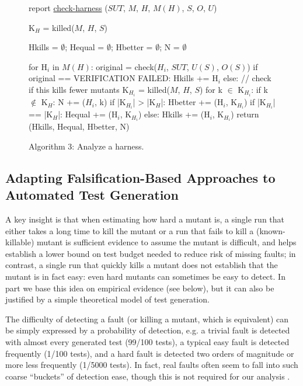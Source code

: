 \documentclass{svjour3}
\begin{document}
\begin{figure}
{\scriptsize 
\begin{code}
report {\underline{check-harness}} ($SUT$, $M$, $H$, $M(H)$, $S$, $O$, $U$) 
\vspace{0.1in}

  K$_H$ = killed($M$, $H$, $S$) 

  Hkills = $\emptyset$; Hequal = $\emptyset$; Hbetter = $\emptyset$; N = $\emptyset$

  for H$_i$ in $M(H)$:
     original = check($H_i$, $SUT$, $U(S)$, $O(S)$)
     if original == VERIFICATION FAILED: 
        Hkills += H$_i$
     else: // check if this kills fewer mutants
        K$_{H_i}$ = killed($M$, $H$, $S$)
        for k $\in$ K$_{H_i}$:
           if k $\not\in$ K$_H$: N += ($H_i$, k)
        if |K$_{H_i}$| > |K$_H$|:
           Hbetter += (H$_i$, K$_{H_i}$)
        if |K$_{H_i}$| == |K$_H$|:
           Hequal += (H$_i$, K$_{H_i}$)
        else:
           Hkills += (H$_i$, K$_{H_i}$)
  return (Hkills, Hequal, Hbetter, N)
\end{code}
}
\caption{Algorithm 3: Analyze a harness.}
\label{alg:checkharness}
\end{figure}


\subsection{Adapting Falsification-Based Approaches to Automated Test
  Generation}


A key insight is that when estimating how hard a mutant is, a single
run that either takes a long time to kill the mutant or a run that
fails to kill a (known-killable) mutant is sufficient evidence to
assume the mutant is difficult, and helps establish a lower bound on
test budget needed to reduce risk of missing faults; in contrast, a
single run that quickly kills a mutant does not establish that the
mutant is in fact easy:  even hard mutants can sometimes be easy to
detect.  In part we base this idea on empirical evidence (see below),
but it can also be justified by a simple theoretical model of test
generation.  

The difficulty of detecting a fault (or killing a mutant, which is
equivalent) can be simply expressed by a probability of detection,
e.g. a trivial fault is detected with almost every generated test
(99/100 tests), a typical easy fault is detected frequently (1/100
tests), and a hard fault is detected two orders of magnitude or more
less frequently (1/5000 tests).  In fact, real faults often seem to
fall into such coarse ``buckets'' of detection ease, though this is not
required for our analysis \cite{PLDI13}.  
\end{document}
